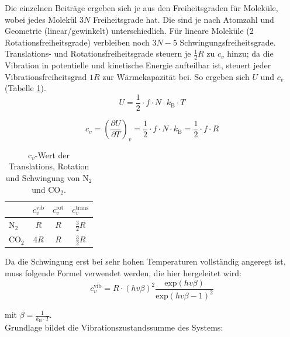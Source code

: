 \documentclass[a4paper,12pt,oneside,onecolum,final,openany]{report}
\begin{document}
Die einzelnen Beiträge ergeben sich je aus den Freiheitsgraden für Moleküle, wobei jedes Molekül $3N$ Freiheitsgrade hat. Die sind je nach Atomzahl und Geometrie (linear/gewinkelt) unterschiedlich. Für lineare Moleküle (2 Rotationsfreiheitsgrade) verbleiben noch $3N-5$ Schwingungsfreiheitsgrade. \\
Translations- und Rotationsfreiheitsgrade steuern je $\frac{1}{2} R$ zu $c_v$ hinzu; da die Vibration in potentielle und kinetische Energie aufteilbar ist, steuert jeder Vibrationsfreiheitsgrad $1R$ zur Wärmekapazität bei. So ergeben sich $U$ und $c_v$ (Tabelle \ref{cvtabelle}).\\

 \begin{equation}
 U= \frac{1}{2} \cdot f \cdot N \cdot k_\mathrm{B} \cdot T
 \end{equation}

\begin{equation}
c_v = \left(\frac{\partial U}{\partial T}\right)_v =\frac{1}{2} \cdot f \cdot N \cdot k_\mathrm{B} = \frac{1}{2}\cdot f\cdot R
\end{equation}



\begin{table} [h] \label{cvtabelle}
\centering
\caption{$\text{c}_v$-Wert der Translations, Rotation und Schwingung von $\text{N}_2$ und $\text{CO}_2$.}
\begin{tabular} {l | c|  c | c}
	 & $c_v^\mathrm{ vib}$  & $c_v^\mathrm{ rot}$ & $c_v^\mathrm{trans}$\\
	 \hline
	 $\mathrm{N}_2$ & $R$ & $R$ &$\frac{3}{2}R$\\
	  $\mathrm{CO}_2$ & 4$R$ & $R$ &$\frac{3}{2}R$\\
\end{tabular}
\end{table}

Da die Schwingung erst bei sehr hohen Temperaturen vollständig angeregt ist, muss folgende Formel verwendet werden, die hier hergeleitet wird: \\


\begin{equation}
c_v^\mathrm{vib} = R\cdot(hv\beta)^2 \frac{\mathrm{exp}(hv\beta)}{\mathrm{exp}(hv\beta -1)^2} \label{cvviblangeFormel}
\end{equation}


mit $\beta=\frac{1}{k_\mathrm{B} \cdot T}$.\\

Grundlage bildet die Vibrationszustandssumme des Systems:\\
\end{document}
